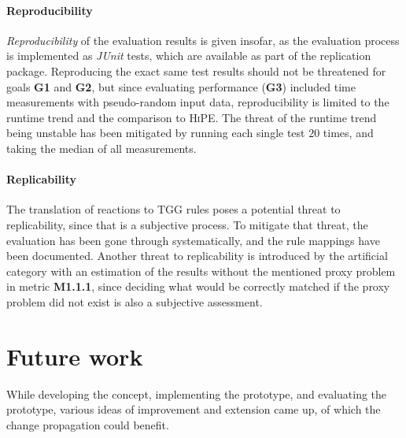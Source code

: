 \paragraph{Reproducibility}
\emph{Reproducibility} of the evaluation results is given insofar, as the evaluation process is implemented as \emph{JUnit} tests, which are available as part of the replication package. Reproducing the exact same test results should not be threatened for goals \textbf{G1} and \textbf{G2}, but since evaluating performance (\textbf{G3}) included time measurements with pseudo-random input data, reproducibility is limited to the runtime trend and the comparison to \textsc{HiPE}. The threat of the runtime trend being unstable has been mitigated by running each single test $20$ times, and taking the median of all measurements.


\paragraph{Replicability}
The translation of reactions to TGG rules poses a potential threat to replicability, since that is a subjective process.
To mitigate that threat, the evaluation has been gone through systematically, and the rule mappings have been documented.
Another threat to replicability is introduced by the artificial category with an estimation of the results without the mentioned proxy problem in metric \textbf{M1.1.1}, since deciding what would be correctly matched if the proxy problem did not exist is also a subjective assessment.

\section{Future work}
\label{sec:Conclusion:FutureWork}
While developing the concept, implementing the prototype, and evaluating the prototype, various ideas of improvement and extension came up, of which the change propagation could benefit.

